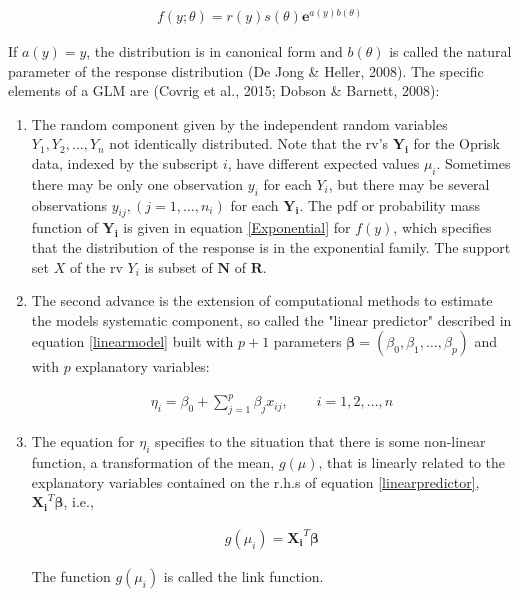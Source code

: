 \documentclass{DissertateUSU}
\begin{document}
\begin{eqnarray}\label{Exponential}
f(y;\theta) = r(y)s(\theta)\mathbf{e}^{a(y)b(\theta)}
\end{eqnarray} \doublespacing

If \(a(y) = y\), the distribution is in canonical form and \(b(\theta)\)
is called the natural parameter of the response distribution (De Jong \&
Heller, 2008). The specific elements of a GLM are (Covrig et al., 2015;
Dobson \& Barnett, 2008):

\begin{enumerate}
\item The random component given by the independent random variables $Y_1, Y_2, \ldots, Y_n $ not identically distributed. Note that the rv's $\mathbf{Y_i}$ for the Oprisk data, indexed by the subscript $i$, have different expected values $\mu_i$. Sometimes there may be only one observation $y_i$ for each $Y_i$, but there may be several observations $y_{ij}, (j=1,\ldots,n_i)$ for each $\mathbf{Y_i}$. The pdf or probability mass function of $\mathbf{Y_i}$ is given in equation \ref{Exponential} for $f(y)$, which specifies that the distribution of the response is in the exponential family. The support set $X$ of the rv $Y_i$ is subset of $\mathbf{N}$ of $\mathbf{R}$. 

\item The second advance is the extension of computational methods to estimate the models systematic component, so called the "linear predictor" described in equation \ref{linearmodel} built with $p+1$ parameters $\mathbf{\beta} = (\beta_0,\beta_1,\ldots,\beta_p)$ and with $p$ explanatory variables:

\singlespacing
\begin{eqnarray}\label{linearpredictor}
\eta_i = \beta_0 + \sum_{j=1}^{p}\beta_jx_{ij}, \qquad i = 1,2,\ldots,n
\end{eqnarray}
\doublespacing

\item The equation for $\eta_i$ specifies to the situation that there is some non-linear function, a transformation of the mean, $g(\mu)$, that is linearly related to the explanatory variables contained on the r.h.s of equation \ref{linearpredictor}, $\mathbf{X_i}^T\mathbf{\beta}$, i.e.,

\singlespacing
\begin{eqnarray}
g(\mu_i) = \mathbf{X_i}^T\mathbf{\beta}
\end{eqnarray}
\doublespacing

The function $g(\mu_i)$ is called the link function.
\end{enumerate}
\end{document}
